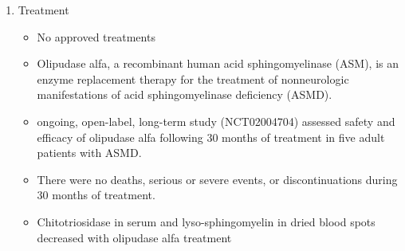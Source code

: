 \documentclass{scrartcl}
\begin{document}
\begin{enumerate}
\item Treatment
\label{sec:org0a1ca9f}
\begin{itemize}
\item No approved treatments
\item Olipudase alfa, a recombinant human acid sphingomyelinase (ASM), is
an enzyme replacement therapy for the treatment of nonneurologic
manifestations of acid sphingomyelinase deficiency (ASMD).
\item ongoing, open-label, long-term study (NCT02004704) assessed safety
and efficacy of olipudase alfa following 30 months of treatment in
five adult patients with ASMD.
\item There were no deaths, serious or severe events, or discontinuations
during 30 months of treatment.
\item Chitotriosidase in serum and lyso-sphingomyelin in dried blood spots
decreased with olipudase alfa treatment
\end{itemize}
\end{enumerate}
\end{document}
